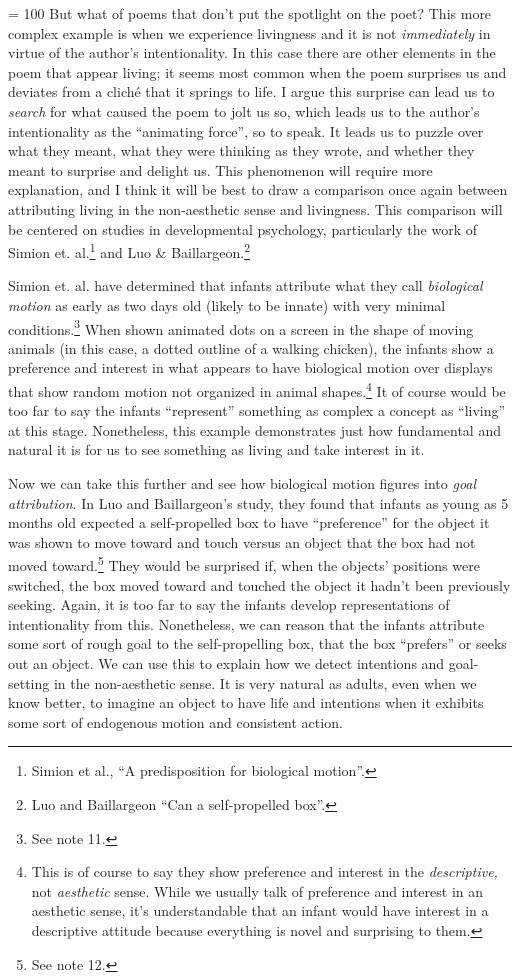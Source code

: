 \pretolerance = 100
But what of poems that don't put the spotlight on the poet? This more
complex example is when we experience livingness and it is not
\emph{immediately} in virtue of the author's intentionality. In this
case there are other elements in the poem that appear living; it seems
most common when the poem surprises us and deviates from a cliché that
it springs to life. I argue this surprise can lead us to \emph{search}
for what caused the poem to jolt us so, which leads us to the author's
intentionality as the ``animating force'', so to speak. It leads us to
puzzle over what they meant, what they were thinking as they wrote, and
whether they meant to surprise and delight us. This phenomenon will
require more explanation, and I think it will be best to draw a
comparison once again between attributing living in the non-aesthetic
sense and livingness. This comparison will be centered on studies in
developmental psychology, particularly the work of Simion et.
al.\footnote{Simion et al., ``A predisposition for biological motion''.}
and Luo \& Baillargeon.\footnote{Luo and Baillargeon ``Can a
  self-propelled box''.}

Simion et. al. have determined that infants attribute what they call
\emph{biological motion} as early as two days old (likely to be innate)
with very minimal conditions.\footnote{See note 11.} When shown animated
dots on a screen in the shape of moving animals (in this case, a dotted
outline of a walking chicken), the infants show a preference and
interest in what appears to have biological motion over displays that
show random motion not organized in animal shapes.\footnote{This is of
  course to say they show preference and interest in the
  \emph{descriptive,} not \emph{aesthetic} sense. While we usually talk
  of preference and interest in an aesthetic sense, it's understandable
  that an infant would have interest in a descriptive attitude because
  everything is novel and surprising to them.} It of course would be too
far to say the infants ``represent'' something as complex a concept as
``living'' at this stage. Nonetheless, this example demonstrates just
how fundamental and natural it is for us to see something as living and
take interest in it.

Now we can take this further and see how biological motion figures into
\emph{goal attribution}. In Luo and Baillargeon's study, they found that
infants as young as 5 months old expected a self-propelled box to have
``preference'' for the object it was shown to move toward and touch
versus an object that the box had not moved toward.\footnote{See note
  12.} They would be surprised if, when the objects' positions were
switched, the box moved toward and touched the object it hadn't been
previously seeking. Again, it is too far to say the infants develop
representations of intentionality from this. Nonetheless, we can reason
that the infants attribute some sort of rough goal to the
self-propelling box, that the box ``prefers'' or seeks out an object. We
can use this to explain how we detect intentions and goal-setting in the
non-aesthetic sense. It is very natural as adults, even when we know
better, to imagine an object to have life and intentions when it
exhibits some sort of endogenous motion and consistent action.

